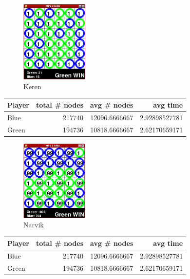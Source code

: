 \begin{multicols*}{2}
\begin{figure}[H]
\centering
\includegraphics[width=0.3\textwidth]{graphics/mm_keren.png}
\caption{Keren}
\end{figure}
\begin{tabular}{l|r|r|r}
  Player & total \# nodes & avg \# nodes & avg time \\
  \hline
  Blue & 217740 & 12096.6666667 & 2.92898527781 \\
  Green & 194736 & 10818.6666667 & 2.62170659171 \\
\end{tabular}

\begin{figure}[H]
\centering
\includegraphics[width=0.3\textwidth]{graphics/mm_narvik.png}
\caption{Narvik}
\end{figure}
\begin{tabular}{l|r|r|r}
  Player & total \# nodes & avg \# nodes & avg time \\
  \hline
  Blue & 217740 & 12096.6666667 & 2.92898527781 \\
  Green & 194736 & 10818.6666667 & 2.62170659171 \\
\end{tabular}


\end{multicols*}

